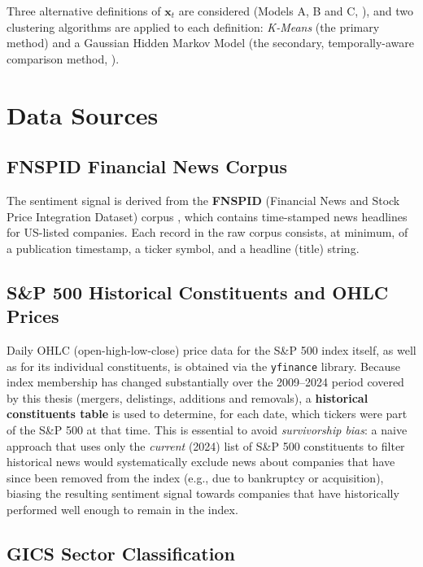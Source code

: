 Three alternative definitions of $\mathbf{x}_t$ are considered (Models A,
B and C, ), and two clustering algorithms are
applied to each definition: \textit{K-Means} (the primary method) and a
Gaussian Hidden Markov Model (the secondary, temporally-aware comparison
method, ).

\section{Data Sources}
\label{sec:meth-data}

\subsection{FNSPID Financial News Corpus}
\label{sec:meth-fnspid}

The sentiment signal is derived from the \textbf{FNSPID} (Financial News
and Stock Price Integration Dataset) corpus \cite{zhang2023fnspid}, which
contains time-stamped news headlines for US-listed companies. Each record
in the raw corpus consists, at minimum, of a publication timestamp, a
ticker symbol, and a headline (title) string.

\subsection{S\&P 500 Historical Constituents and OHLC Prices}
\label{sec:meth-sp500}

Daily OHLC (open-high-low-close) price data for the S\&P 500 index itself,
as well as for its individual constituents, is obtained via the
\texttt{yfinance} library. Because index membership has changed
substantially over the 2009--2024 period covered by this thesis (mergers,
delistings, additions and removals), a \textbf{historical constituents
table} is used to determine, for each date, which tickers were part of
the S\&P 500 at that time. This is essential to avoid
\emph{survivorship bias}: a naive approach that uses only the
\emph{current} (2024) list of S\&P 500 constituents to filter historical
news would systematically exclude news about companies that have since
been removed from the index (e.g., due to bankruptcy or acquisition),
biasing the resulting sentiment signal towards companies that have
historically performed well enough to remain in the index.

\subsection{GICS Sector Classification}
\label{sec:meth-gics}

